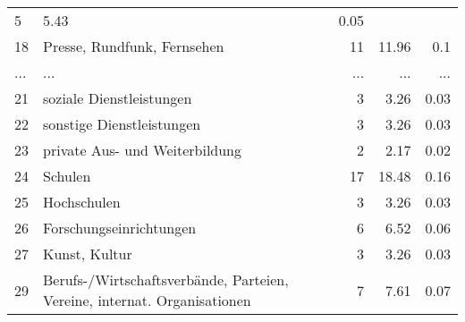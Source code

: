 \begin{longtable}{lXrrr}
          \num{5} &
          \num[round-mode=places,round-precision=2]{5,43} &
          \num[round-mode=places,round-precision=2]{0,05} \\
        18 & \multicolumn{1}{X}{Presse, Rundfunk, Fernsehen} & %
          \num{11} &
          \num[round-mode=places,round-precision=2]{11,96} &
          \num[round-mode=places,round-precision=2]{0,1} \\
       ... & ... & ... & ... & ... \\
        21 & \multicolumn{1}{X}{soziale Dienstleistungen} & %
          \num{3} &
          \num[round-mode=places,round-precision=2]{3,26} &
          \num[round-mode=places,round-precision=2]{0,03} \\

        22 & \multicolumn{1}{X}{sonstige Dienstleistungen} & %
          \num{3} &
          \num[round-mode=places,round-precision=2]{3,26} &
          \num[round-mode=places,round-precision=2]{0,03} \\

        23 & \multicolumn{1}{X}{private Aus- und Weiterbildung} & %
          \num{2} &
          \num[round-mode=places,round-precision=2]{2,17} &
          \num[round-mode=places,round-precision=2]{0,02} \\

        24 & \multicolumn{1}{X}{Schulen} & %
          \num{17} &
          \num[round-mode=places,round-precision=2]{18,48} &
          \num[round-mode=places,round-precision=2]{0,16} \\

        25 & \multicolumn{1}{X}{Hochschulen} & %
          \num{3} &
          \num[round-mode=places,round-precision=2]{3,26} &
          \num[round-mode=places,round-precision=2]{0,03} \\

        26 & \multicolumn{1}{X}{Forschungseinrichtungen} & %
          \num{6} &
          \num[round-mode=places,round-precision=2]{6,52} &
          \num[round-mode=places,round-precision=2]{0,06} \\

        27 & \multicolumn{1}{X}{Kunst, Kultur} & %
          \num{3} &
          \num[round-mode=places,round-precision=2]{3,26} &
          \num[round-mode=places,round-precision=2]{0,03} \\

        29 & \multicolumn{1}{X}{Berufs-/Wirtschaftsverbände, Parteien, Vereine, internat. Organisationen} & %
          \num{7} &
          \num[round-mode=places,round-precision=2]{7,61} &
          \num[round-mode=places,round-precision=2]{0,07} \\


\end{longtable}
